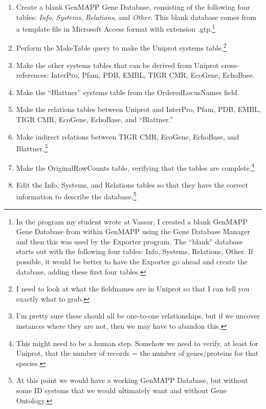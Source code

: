 \documentclass[11pt]{article}
\begin{document}
\begin{enumerate}
\item Create a blank GenMAPP Gene Database, consisting of the following four tables: \emph{Info}, \emph{Systems}, \emph{Relations}, and \emph{Other}.  This blank database comes from a template file in Microsoft Access format with extension .gtp.\footnote{In the program my student wrote at Vassar, I created a blank GenMAPP Gene Database from within GenMAPP using the Gene Database Manager and then this was used by the Exporter program.  The ``blank'' database starts out with the following four tables:  Info, Systems, Relations, Other.  If possible, it would be better to have the Exporter go ahead and create the database, adding these first four tables.}

\item Perform the MakeTable query to make the Uniprot systems table.\footnote{I need to look at what the fieldnames are in Uniprot so that I can tell you exactly what to grab.}

\item Make the other systems tables that can be derived from Uniprot cross-references: InterPro, Pfam, PDB, EMBL, TIGR CMR, EcoGene, EchoBase.

\item Make the ``Blattner'' systems table from the OrderedLocusNames field.

\item Make the relations tables between Uniprot and InterPro, Pfam, PDB, EMBL, TIGR CMR, EcoGene, EchoBase, and ``Blattner.''

\item Make indirect relations between TIGR CMR, EcoGene, EchoBase, and Blattner.\footnote{I'm pretty sure these should all be one-to-one relationships, but if we uncover instances where they are not, then we may have to abandon this.}

\item Make the OriginalRowCounts table, verifying that the tables are complete.\footnote{This might need to be a human step.  Somehow we need to verify, at least for Uniprot, that the number of records = the number of genes/proteins for that species.}

\item Edit the Info, Systems, and Relations tables so that they have the correct information to describe the database.\footnote{
At this point we would have a working GenMAPP Database, but without some ID systems that we would ultimately want and without Gene Ontology.

}
\end{enumerate}
\end{document}
